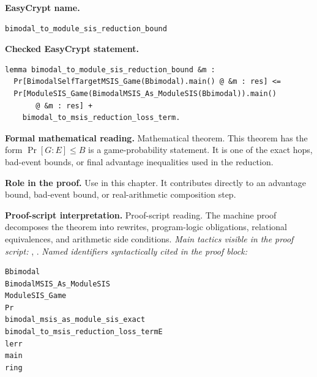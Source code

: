 \begin{formaltheorem}
\noindent\textbf{EasyCrypt name.}
\begin{lstlisting}[language=EasyCrypt,basicstyle=\ttfamily\scriptsize]
bimodal_to_module_sis_reduction_bound
\end{lstlisting}
\noindent\textbf{Checked EasyCrypt statement.}
\begin{lstlisting}[language=EasyCrypt,basicstyle=\ttfamily\scriptsize]
lemma bimodal_to_module_sis_reduction_bound &m :
  Pr[BimodalSelfTargetMSIS_Game(Bbimodal).main() @ &m : res] <=
  Pr[ModuleSIS_Game(BimodalMSIS_As_ModuleSIS(Bbimodal)).main()
       @ &m : res] +
    bimodal_to_msis_reduction_loss_term.
\end{lstlisting}
\noindent\textbf{Formal mathematical reading.}
Mathematical theorem. This theorem has the form \(\Pr[G:E] \le B\) is a game-probability statement.  It is one of the exact hops, bad-event bounds, or final advantage inequalities used in the reduction.

\noindent\textbf{Role in the proof.}
Use in this chapter. It contributes directly to an advantage bound, bad-event bound, or real-arithmetic composition step.

\noindent\textbf{Proof-script interpretation.}
Proof-script reading. The machine proof decomposes the theorem into rewrites, program-logic obligations, relational equivalences, and arithmetic side conditions.
\emph{Main tactics visible in the proof script:} , .
\emph{Named identifiers syntactically cited in the proof block:}
\begin{lstlisting}[language=EasyCrypt,basicstyle=\ttfamily\scriptsize]
Bbimodal
BimodalMSIS_As_ModuleSIS
ModuleSIS_Game
Pr
bimodal_msis_as_module_sis_exact
bimodal_to_msis_reduction_loss_termE
lerr
main
ring
\end{lstlisting}

\end{formaltheorem}

